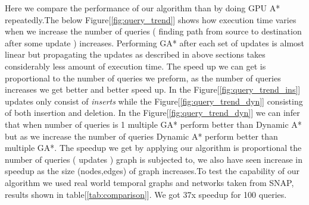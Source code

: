 \documentclass[a4paper]{article}
\begin{document}
Here we compare the performance of our algorithm than by doing GPU A* repeatedly.The below Figure[\ref{fig:query_trend}] shows how execution time varies when we increase the number of queries ( finding path from source to destination after some update ) increases. Performing  GA* after each set of updates is almost linear but propagating the updates as described in above sections takes considerably less amount of execution time. The speed up we can get is proportional to the number of queries we preform, as the number of queries increases we get better and better speed up. In the Figure[\ref{fig:query_trend_ins}] updates only consist of \textit{inserts} while the Figure[\ref{fig:query_trend_dyn}] consisting of both insertion and deletion. In the Figure[\ref{fig:query_trend_dyn}] we can infer that when number of queries is 1 multiple GA* perform better than Dynamic A* but as we increase the number of queries Dynamic A* perform better than multiple GA*. The speedup we get by applying our algorithm is proportional the number of queries ( updates ) graph is subjected to, we also have seen increase in speedup as the size (nodes,edges) of graph increases.To test the capability of our algorithm we used real world temporal graphs and networks taken from SNAP\cite{SNAP}, results shown in table[\ref{tab:comparison}]. We got 37x speedup for 100 queries.
\end{document}
